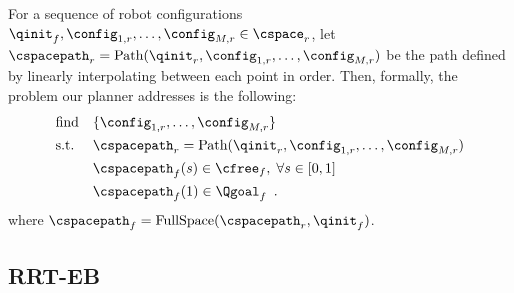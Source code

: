 For a sequence of robot configurations $\qinit_f, \config_{1,r}, \dots, \config_{M,r} \in \cspace_r$, let $\cspacepath_r = \textrm{Path}(\qinit_r, \config_{1,r}, \dots, \config_{M,r})$ be the path defined by linearly interpolating between each point in order. Then, formally, the problem our planner addresses is the following:
\begin{equation}
    \begin{aligned}
        & \text{find}   & & \{ \config_{1,r}, \dots, \config_{M,r} \} \\
        & \text{s.t.}   & & \cspacepath_r = \textrm{Path}(\qinit_r, \config_{1,r}, \dots, \config_{M,r}) \\
        &               & & \cspacepath_f(s) \in \cfree_f, \; \forall s \in [0, 1] \\
        &               & & \cspacepath_f(1) \in \Qgoal_f \enspace .
    \end{aligned}
    \label{eqn:planning_problemstatement}
\end{equation}
\noindent where $\cspacepath_f = \textrm{FullSpace}(\cspacepath_r, \qinit_f)$.


\subsection{RRT-EB}

